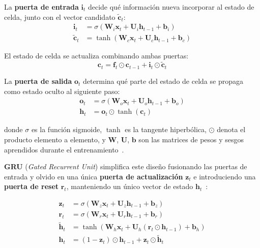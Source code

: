 \documentclass[12pt, a4paper]{article}
\begin{document}
La \textbf{puerta de entrada} $\mathbf{i}_t$ decide qué información nueva incorporar al estado de celda, junto con el vector candidato $\tilde{\mathbf{c}}_t$:
\begin{align}
\mathbf{i}_t &= \sigma(\mathbf{W}_i \mathbf{x}_t + \mathbf{U}_i \mathbf{h}_{t-1} + \mathbf{b}_i) \\
\tilde{\mathbf{c}}_t &= \tanh(\mathbf{W}_c \mathbf{x}_t + \mathbf{U}_c \mathbf{h}_{t-1} + \mathbf{b}_c)
\end{align}

El estado de celda se actualiza combinando ambas puertas:
\begin{equation}
\mathbf{c}_t = \mathbf{f}_t \odot \mathbf{c}_{t-1} + \mathbf{i}_t \odot \tilde{\mathbf{c}}_t
\end{equation}

La \textbf{puerta de salida} $\mathbf{o}_t$ determina qué parte del estado de celda se propaga como estado oculto al siguiente paso:
\begin{align}
\mathbf{o}_t &= \sigma(\mathbf{W}_o \mathbf{x}_t + \mathbf{U}_o \mathbf{h}_{t-1} + \mathbf{b}_o) \\
\mathbf{h}_t &= \mathbf{o}_t \odot \tanh(\mathbf{c}_t)
\end{align}

donde $\sigma$ es la función sigmoide, $\tanh$ es la tangente hiperbólica, $\odot$ denota el producto elemento a elemento, y $\mathbf{W}$, $\mathbf{U}$, $\mathbf{b}$ son las matrices de pesos y sesgos aprendidos durante el entrenamiento~\cite{hochreiter1997}.

\textbf{GRU} (\textit{Gated Recurrent Unit}) simplifica este diseño fusionando las puertas de entrada y olvido en una única \textbf{puerta de actualización} $\mathbf{z}_t$ e introduciendo una \textbf{puerta de reset} $\mathbf{r}_t$, manteniendo un único vector de estado $\mathbf{h}_t$~\cite{cho2014}:

\begin{align}
\mathbf{z}_t &= \sigma(\mathbf{W}_z \mathbf{x}_t + \mathbf{U}_z \mathbf{h}_{t-1} + \mathbf{b}_z) \\
\mathbf{r}_t &= \sigma(\mathbf{W}_r \mathbf{x}_t + \mathbf{U}_r \mathbf{h}_{t-1} + \mathbf{b}_r) \\
\tilde{\mathbf{h}}_t &= \tanh(\mathbf{W}_h \mathbf{x}_t + \mathbf{U}_h (\mathbf{r}_t \odot \mathbf{h}_{t-1}) + \mathbf{b}_h) \\
\mathbf{h}_t &= (1 - \mathbf{z}_t) \odot \mathbf{h}_{t-1} + \mathbf{z}_t \odot \tilde{\mathbf{h}}_t
\end{align}
\end{document}
